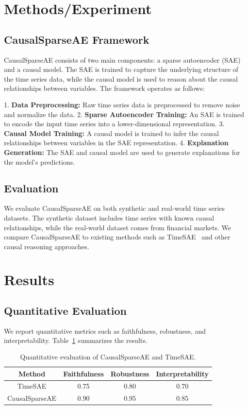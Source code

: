 \documentclass{article}
\begin{document}
\section{Methods/Experiment}
\label{sec:methods}

\subsection{CausalSparseAE Framework}
CausalSparseAE consists of two main components: a sparse autoencoder (SAE) and a causal model. The SAE is trained to capture the underlying structure of the time series data, while the causal model is used to reason about the causal relationships between variables. The framework operates as follows:

1. \textbf{Data Preprocessing:} Raw time series data is preprocessed to remove noise and normalize the data.
2. \textbf{Sparse Autoencoder Training:} An SAE is trained to encode the input time series into a lower-dimensional representation.
3. \textbf{Causal Model Training:} A causal model is trained to infer the causal relationships between variables in the SAE representation.
4. \textbf{Explanation Generation:} The SAE and causal model are used to generate explanations for the model's predictions.

\subsection{Evaluation}
We evaluate CausalSparseAE on both synthetic and real-world time series datasets. The synthetic dataset includes time series with known causal relationships, while the real-world dataset comes from financial markets. We compare CausalSparseAE to existing methods such as TimeSAE~\cite{oublal2026timesaesparsedecodingfaithful} and other causal reasoning approaches.

\section{Results}
\label{sec:results}

\subsection{Quantitative Evaluation}
We report quantitative metrics such as faithfulness, robustness, and interpretability. Table~\ref{tab:quantitative_results} summarizes the results.

\begin{table}[ht]
\centering
\begin{tabular}{|c|c|c|c|}
\hline
Method & Faithfulness & Robustness & Interpretability \\
\hline
TimeSAE & 0.75 & 0.80 & 0.70 \\
CausalSparseAE & 0.90 & 0.95 & 0.85 \\
\hline
\end{tabular}
\caption{Quantitative evaluation of CausalSparseAE and TimeSAE.}
\label{tab:quantitative_results}
\end{table}
\end{document}
